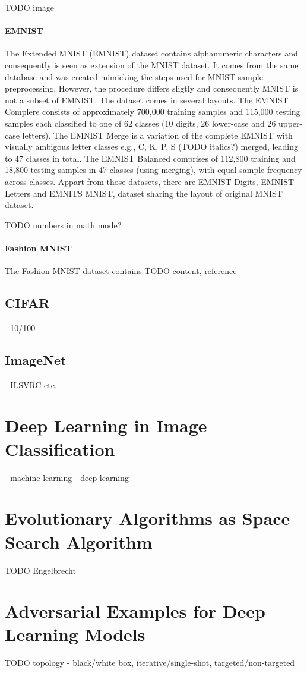 TODO image

\paragraph{EMNIST}

The Extended MNIST (EMNIST) dataset contains alphanumeric characters and consequently is seen as extension of the MNIST dataset. It comes from the same database and was created mimicking the steps used for MNIST sample preprocessing. However, the procedure differs sligtly and consequently MNIST is not a subset of EMNIST. The dataset comes in several layouts. The EMNIST Complere consists of approximately 700,000 training samples and 115,000 testing samples each classified to one of 62 classes (10 digits, 26 lower-case and 26 upper-case letters). The EMNIST Merge is a variation of the complete EMNIST with visually ambigous letter classes e.g., C, K, P, S (TODO italics?) merged, leading to 47 classes in total. The EMNIST Balanced comprises of 112,800 training and 18,800 testing samples in 47 classes (using merging), with equal sample frequency across classes. Appart from those datasets, there are EMNIST Digits, EMNIST Letters and EMNITS MNIST, dataset sharing the layout of original MNIST dataset. \cite{DBLP:journals/corr/CohenATS17}

TODO numbers in math mode?

\paragraph{Fashion MNIST}

The Fashion MNIST dataset contains 
TODO content, reference


\subsection{CIFAR}
- 10/100

\subsection{ImageNet}
- ILSVRC etc.

\section{Deep Learning in Image Classification}
\label{sec:deep_learning}
- machine learning
- deep learning

\section{Evolutionary Algorithms as Space Search Algorithm}
TODO Engelbrecht

\section{Adversarial Examples for Deep Learning Models}
TODO topology - black/white box, iterative/single-shot, targeted/non-targeted

